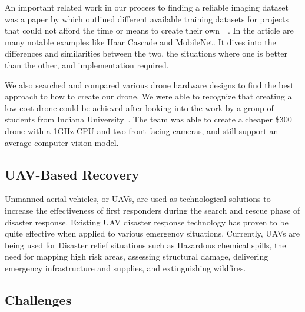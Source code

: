 An important related work in our process to finding a reliable imaging dataset was a paper by which outlined different available training datasets for projects that could not afford the time or means to create their own~~\cite{datasets}. In the article are many notable examples like Haar Cascade and MobileNet. It dives into the differences and similarities between the two, the situations where one is better than the other, and implementation required. %

We also searched and compared various drone hardware designs to find the best approach to how to create our drone. We were able to recognize that creating a low-cost drone could be achieved after looking into the work by a group of students from Indiana University~\cite{indianauav}. The team was able to create a cheaper \$300 drone with a 1GHz CPU and two front-facing cameras, and still support an average computer vision model. 
% 


\subsection{UAV-Based Recovery}
Unmanned aerial vehicles, or UAVs, are used as technological solutions to increase the effectiveness of first responders during the search and rescue phase of disaster response. Existing UAV disaster response technology has proven to be quite effective when applied to various emergency situations. Currently, UAVs are being used for Disaster relief situations such as Hazardous chemical spills, the need for mapping high risk areas, assessing structural damage, delivering emergency infrastructure and supplies, and extinguishing wildfires.




\subsection{Challenges}

